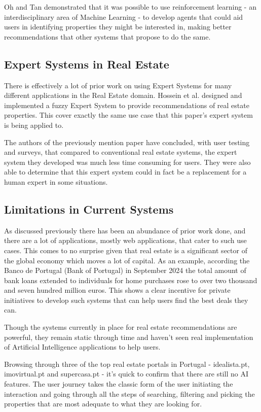 \documentclass[runningheads]{llncs}
\begin{document}
Oh and Tan\cite{reinforcement} demonstrated that it was possible to use reinforcement learning - an interdisciplinary area of Machine Learning - to develop agents that could aid users in identifying properties they might be interested in, making better recommendations that other systems that propose to do the same.

\subsection{Expert Systems in Real Estate}

There is effectively a lot of prior work on using Expert Systems for many different applications in the Real Estate domain. Hossein et al.\cite{hossein} designed and implemented a fuzzy Expert System to provide recommendations of real estate properties. This cover exactly the same use case that this paper's expert system is being applied to.

The authors of the previously mention paper have concluded, with user testing and surveys, that compared to conventional real estate systems, the expert system they developed was much less time consuming for users. They were also able to determine that this expert system could in fact be a replacement for a human expert in some situations.

\subsection{Limitations in Current Systems}

As discussed previously there has been an abundance of prior work done, and there are a lot of applications, mostly web applications, that cater to such use cases. This comes to no surprise given that real estate is a significant sector of the global economy which moves a lot of capital. As an example, according the Banco de Portugal (Bank of Portugal)\cite{bancoportugal} in September 2024 the total amount of bank loans extended to individuals for home purchases rose to over two thousand and seven hundred million euros. This shows a clear incentive for private initiatives to develop such systems that can help users find the best deals they can.

Though the systems currently in place for real estate recommendations are powerful, they remain static through time and haven't seen real implementation of Artificial Intelligence applications to help users.

Browsing through three of the top real estate portals in Portugal - idealista.pt, imovirtual.pt and supercasa.pt - it's quick to confirm that there are still no AI features. The user journey takes the classic form of the user initiating the interaction and going through all the steps of searching, filtering and picking the properties that are most adequate to what they are looking for.
\end{document}
